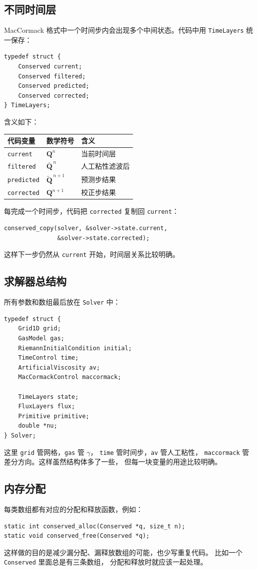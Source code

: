 \subsection{不同时间层}

MacCormack 格式中一个时间步内会出现多个中间状态。代码中用
\texttt{TimeLayers} 统一保存：
\begin{lstlisting}
typedef struct {
    Conserved current;
    Conserved filtered;
    Conserved predicted;
    Conserved corrected;
} TimeLayers;
\end{lstlisting}

含义如下：

\begin{center}
\begin{tabular}{lll}
\toprule
代码变量 & 数学符号 & 含义 \\
\midrule
\texttt{current} & \(\bm Q^n\) & 当前时间层 \\
\texttt{filtered} & \(\bar{\bm Q}^{\,n}\) & 人工粘性滤波后 \\
\texttt{predicted} & \(\tilde{\bm Q}^{\,n+1}\) & 预测步结果 \\
\texttt{corrected} & \(\bm Q^{n+1}\) & 校正步结果 \\
\bottomrule
\end{tabular}
\end{center}

每完成一个时间步，代码把 \texttt{corrected} 复制回 \texttt{current}：
\begin{lstlisting}
conserved_copy(solver, &solver->state.current,
               &solver->state.corrected);
\end{lstlisting}
这样下一步仍然从 \texttt{current} 开始，时间层关系比较明确。

\subsection{求解器总结构}

所有参数和数组最后放在 \texttt{Solver} 中：
\begin{lstlisting}
typedef struct {
    Grid1D grid;
    GasModel gas;
    RiemannInitialCondition initial;
    TimeControl time;
    ArtificialViscosity av;
    MacCormackControl maccormack;

    TimeLayers state;
    FluxLayers flux;
    Primitive primitive;
    double *nu;
} Solver;
\end{lstlisting}

这里 \texttt{grid} 管网格，\texttt{gas} 管 \(\gamma\)，
\texttt{time} 管时间步，\texttt{av} 管人工粘性，
\texttt{maccormack} 管差分方向。这样虽然结构体多了一些，
但每一块变量的用途比较明确。

\subsection{内存分配}

每类数组都有对应的分配和释放函数，例如：
\begin{lstlisting}
static int conserved_alloc(Conserved *q, size_t n);
static void conserved_free(Conserved *q);
\end{lstlisting}

这样做的目的是减少漏分配、漏释放数组的可能，也少写重复代码。
比如一个 \texttt{Conserved} 里面总是有三条数组，
分配和释放时就应该一起处理。

